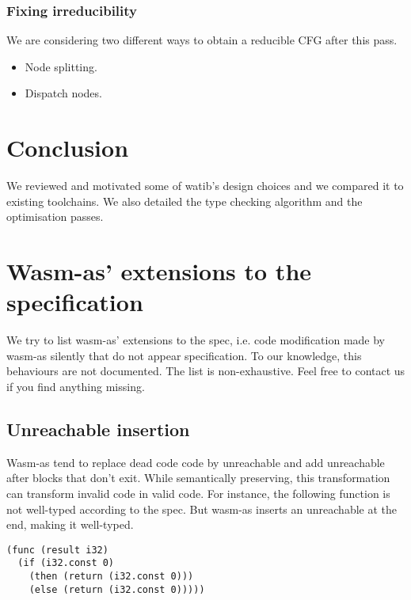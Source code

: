 \documentclass[a4paper,11pt]{article}
\begin{document}
\subsubsection{Fixing irreducibility}
We are considering two different ways to obtain a reducible CFG after this pass.
\begin{itemize}
  \item Node splitting.
  \item Dispatch nodes.
\end{itemize}


\section{Conclusion}
We reviewed and motivated some of \textsf{watib}'s design choices and we
compared it to existing toolchains. We also detailed the type checking algorithm
and the optimisation passes.

\printbibliography
\newpage
\appendix
\section{Wasm-as' extensions to the specification}\label{wasmasex}
We try to list wasm-as' extensions to the spec, i.e. code modification made by
wasm-as silently that do not appear specification. To our knowledge, this
behaviours are not documented. The list is non-exhaustive. Feel free to contact
us if you find anything missing.
\subsection{\textsf{Unreachable} insertion}
Wasm-as tend to replace dead code code by \textsf{unreachable} and add
\textsf{unreachable} after blocks that don't exit. While semantically
preserving, this transformation can transform invalid code in valid code. For
instance, the following function is not well-typed according to the spec. But
wasm-as inserts an \textsf{unreachable} at the end, making it well-typed.
\begin{lstlisting}
(func (result i32)
  (if (i32.const 0)
    (then (return (i32.const 0)))
    (else (return (i32.const 0)))))
\end{lstlisting}
\end{document}
